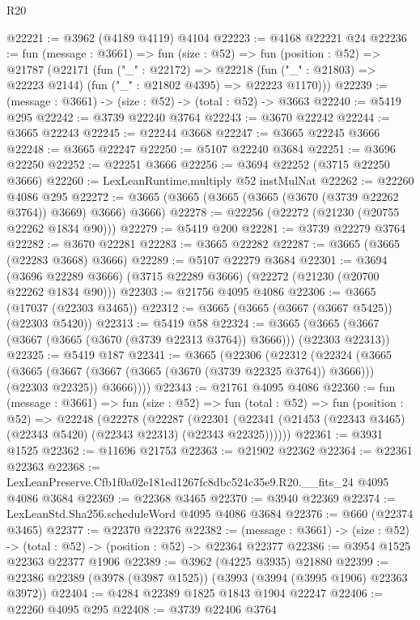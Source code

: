 \begin{lexlean}{R20}
\begin{coremodule}
@22221 := @3962 (@4189 @4119) @4104
@22223 := @4168 @22221 @24
@22236 := fun (message : @3661) =>
  fun (size : @52) =>
  fun (position : @52) =>
  @21787
    (@22171
      (fun ("_" : @22172) =>
      @22218 (fun ("_" : @21803) => @22223 @2144) (fun ("_" : @21802 @4395) => @22223 @1170)))
@22239 := (message : @3661) -> (size : @52) -> (total : @52) -> @3663
@22240 := @5419 @295
@22242 := @3739 @22240 @3764
@22243 := @3670 @22242
@22244 := @3665 @22243
@22245 := @22244 @3668
@22247 := @3665 @22245 @3666
@22248 := @3665 @22247
@22250 := @5107 @22240 @3684
@22251 := @3696 @22250
@22252 := @22251 @3666
@22256 := @3694 @22252 (@3715 @22250 @3666)
@22260 := LexLeanRuntime.multiply @52 instMulNat
@22262 := @22260 @4086 @295
@22272 := @3665 (@3665 (@3665 (@3665 (@3670 (@3739 @22262 @3764)) @3669) @3666) @3666)
@22278 := @22256 (@22272 (@21230 (@20755 @22262 @1834 @90)))
@22279 := @5419 @200
@22281 := @3739 @22279 @3764
@22282 := @3670 @22281
@22283 := @3665 @22282
@22287 := @3665 (@3665 (@22283 @3668) @3666)
@22289 := @5107 @22279 @3684
@22301 := @3694
    (@3696 @22289 @3666)
    (@3715 @22289 @3666)
    (@22272 (@21230 (@20700 @22262 @1834 @90)))
@22303 := @21756 @4095 @4086
@22306 := @3665 (@17037 (@22303 @3465))
@22312 := @3665 (@3665 (@3667 (@3667 @5425)) (@22303 @5420))
@22313 := @5419 @58
@22324 := @3665 (@3665 (@3667 (@3667 (@3665 (@3670 (@3739 @22313 @3764)) @3666))) (@22303 @22313))
@22325 := @5419 @187
@22341 := @3665
    (@22306
      (@22312
        (@22324
          (@3665
            (@3665 (@3667 (@3667 (@3665 (@3670 (@3739 @22325 @3764)) @3666))) (@22303 @22325))
            @3666))))
@22343 := @21761 @4095 @4086
@22360 := fun (message : @3661) =>
  fun (size : @52) =>
  fun (total : @52) =>
  fun (position : @52) =>
  @22248
    (@22278
      (@22287
        (@22301 (@22341 (@21453 (@22343 @3465) (@22343 @5420) (@22343 @22313) (@22343 @22325))))))
@22361 := @3931 @1525
@22362 := @11696 @21753
@22363 := @21902 @22362
@22364 := @22361 @22363
@22368 := LexLeanPreserve.Cfb1f0a02e181ed1267fc8dbc524c35e9.R20.__fits_24 @4095 @4086 @3684
@22369 := @22368 @3465
@22370 := @3940 @22369
@22374 := LexLeanStd.Sha256.scheduleWord @4095 @4086 @3684
@22376 := @660 (@22374 @3465)
@22377 := @22370 @22376
@22382 := (message : @3661) -> (size : @52) -> (total : @52) -> (position : @52) -> @22364 @22377
@22386 := @3954 @1525 @22363 @22377 @1906
@22389 := @3962 (@4225 @3935) @21880
@22399 := @22386 @22389 (@3978 (@3987 @1525)) (@3993 (@3994 (@3995 @1906) @22363 @3972))
@22404 := @4284 @22389 @1825 @1843 @1904 @22247
@22406 := @22260 @4095 @295
@22408 := @3739 @22406 @3764

\end{coremodule}
\end{lexlean}
